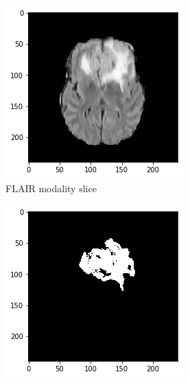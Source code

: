 \begin{figure}[H]
    \centering
    \begin{subfigure}[t]{.21\textwidth}
        \centering
        \includegraphics[width=\linewidth]{chapters/06_hdm/c_Brats18_2013_17_1_L1/56.png}
        \caption{FLAIR modality slice}
    \end{subfigure}%
    \begin{subfigure}[t]{.21\textwidth}
        \centering
        \includegraphics[width=\linewidth]{chapters/06_hdm/c_Brats18_2013_17_1_L1/55.png}

\end{subfigure}
\end{figure}

